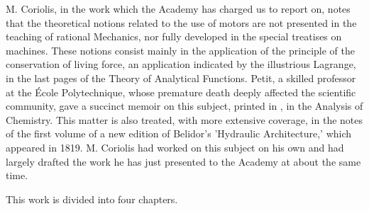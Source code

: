 \documentclass{book}
\begin{document}
M. Coriolis, in the work which the Academy has charged us to report on, notes that the theoretical notions related to the use of motors are not presented in the teaching of rational Mechanics, nor fully developed in the special treatises on machines. These notions consist mainly in the application of the principle of the conservation of living force, an application indicated by the illustrious Lagrange, in the last pages of the Theory of Analytical Functions. Petit, a skilled professor at the École Polytechnique, whose premature 
 death deeply affected the scientific community, gave a succinct memoir on this subject, printed in 
, in the Analysis of Chemistry.
This matter is also treated, with more extensive coverage, in the notes of the first volume of a new edition of Belidor's 'Hydraulic Architecture,' which appeared in 1819. M. Coriolis had worked on this subject on his own and had largely drafted the work he has just presented to the Academy at about the same time.

This work is divided into four chapters.
\end{document}
